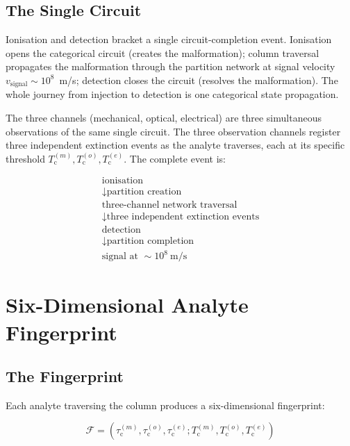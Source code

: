 \documentclass[twocolumn,10pt,a4paper]{article}
\theoremstyle{definition}
\theoremstyle{remark}
\newcommand{\tauM}{\tau_{\mathrm{c}}^{(m)}}
\newcommand{\tauO}{\tau_{\mathrm{c}}^{(o)}}
\newcommand{\tauE}{\tau_{\mathrm{c}}^{(e)}}
\newcommand{\TcM}{T_{\mathrm{c}}^{(m)}}
\newcommand{\TcO}{T_{\mathrm{c}}^{(o)}}
\newcommand{\TcE}{T_{\mathrm{c}}^{(e)}}
\begin{document}
\subsection{The Single Circuit}

Ionisation and detection bracket a single circuit-completion event. Ionisation opens the categorical circuit (creates the malformation); column traversal propagates the malformation through the partition network at signal velocity $v_{\mathrm{signal}} \sim 10^8$~m/s; detection closes the circuit (resolves the malformation). The whole journey from injection to detection is one categorical state propagation.

The three channels (mechanical, optical, electrical) are three simultaneous observations of the same single circuit. The three observation channels register three independent extinction events as the analyte traverses, each at its specific threshold $\TcM, \TcO, \TcE$. The complete event is:

\begin{equation*}
\boxed{
\begin{array}{c}
\text{ionisation} \\
\downarrow \text{partition creation}\\
\text{three-channel network traversal} \\
\downarrow \text{three independent extinction events}\\
\text{detection} \\
\downarrow \text{partition completion}\\
\text{signal at } \sim 10^8~\text{m/s}
\end{array}
}
\end{equation*}

\section{Six-Dimensional Analyte Fingerprint}
\label{sec:six_dim}

\subsection{The Fingerprint}

Each analyte traversing the column produces a six-dimensional fingerprint:

\begin{equation}
\boxed{\mathcal{F} = (\tauM, \tauO, \tauE; \TcM, \TcO, \TcE)}
\label{eq:6d_fingerprint}
\end{equation}
\end{document}
